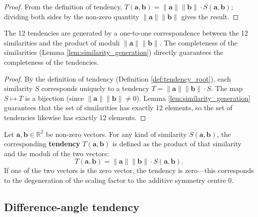 \begin{proof}
From the definition of tendency, $T(\mathbf{a},\mathbf{b}) = \|\mathbf{a}\| \|\mathbf{b}\| \cdot S(\mathbf{a},\mathbf{b})$; dividing both sides by the non-zero quantity $\|\mathbf{a}\| \|\mathbf{b}\|$ gives the result.
\end{proof}

\begin{corollary}\label{cor:tendency_completeness}
The 12 tendencies are generated by a one-to-one correspondence between the 12 similarities and the product of moduli $\|\mathbf{a}\|\|\mathbf{b}\|$. The completeness of the similarities (Lemma \ref{lem:similarity_generation}) directly guarantees the completeness of the tendencies.
\end{corollary}

\begin{proof}
By the definition of tendency (Definition \ref{def:tendency_root}), each similarity $S$ corresponds uniquely to a tendency $T = \|\mathbf{a}\|\|\mathbf{b}\| \cdot S$. The map $S \mapsto T$ is a bijection (since $\|\mathbf{a}\|\|\mathbf{b}\| \neq 0$). Lemma \ref{lem:similarity_generation} guarantees that the set of similarities has exactly 12 elements, so the set of tendencies likewise has exactly 12 elements.
\end{proof}

\begin{definition}[Tendency]\label{def:tendency}
Let $\mathbf{a}, \mathbf{b} \in \mathbb{R}^2$ be non-zero vectors. For any kind of similarity $S(\mathbf{a}, \mathbf{b})$, the corresponding \textbf{tendency} $T(\mathbf{a}, \mathbf{b})$ is defined as the product of that similarity and the moduli of the two vectors:
\[
T(\mathbf{a}, \mathbf{b}) = \|\mathbf{a}\| \|\mathbf{b}\| \cdot S(\mathbf{a}, \mathbf{b}).
\]
If one of the two vectors is the zero vector, the tendency is zero---this corresponds to the degeneration of the scaling factor to the additive symmetry centre $0$.
\end{definition}

\subsection{\texorpdfstring{Difference-angle tendency}{Difference-angle tendency}}

